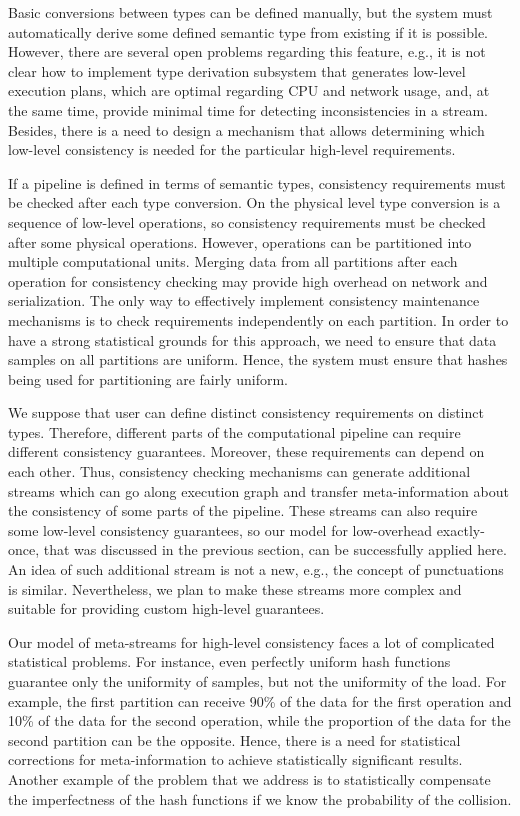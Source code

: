 Basic conversions between types can be defined manually, but the system must automatically derive some defined semantic type from existing if it is possible. However, there are several open problems regarding this feature, e.g., it is not clear how to implement type derivation subsystem that generates low-level execution plans, which are optimal regarding CPU and network usage, and, at the same time, provide minimal time for detecting inconsistencies in a stream. Besides, there is a need to design a mechanism that allows determining which low-level consistency is needed for the particular high-level requirements.  

If a pipeline is defined in terms of semantic types, consistency requirements must be checked after each type conversion. On the physical level type conversion is a sequence of low-level operations, so consistency requirements must be checked after some physical operations. However, operations can be partitioned into multiple computational units. Merging data from all partitions after each operation for consistency checking may provide high overhead on network and serialization. The only way to effectively implement consistency maintenance mechanisms is to check requirements independently on each partition. In order to have a strong statistical grounds for this approach, we need to ensure that data samples on all partitions are uniform. Hence, the system must ensure that hashes being used for partitioning are fairly uniform.

We suppose that user can define distinct consistency requirements on distinct types. Therefore, different parts of the computational pipeline can require different consistency guarantees. Moreover, these requirements can depend on each other. Thus, consistency checking mechanisms can generate additional streams which can go along execution graph and transfer meta-information about the consistency of some parts of the pipeline. These streams can also require some low-level consistency guarantees, so our model for low-overhead exactly-once, that was discussed in the previous section, can be successfully applied here. An idea of such additional stream is not a new, e.g., the concept of punctuations~\cite{Tucker:2003:EPS:776752.776780} is similar. Nevertheless, we plan to make these streams more complex and suitable for providing custom high-level guarantees.

Our model of meta-streams for high-level consistency faces a lot of complicated statistical problems. For instance, even perfectly uniform hash functions guarantee only the uniformity of samples, but not the uniformity of the load. For example, the first partition can receive 90\% of the data for the first operation and 10\% of the data for the second operation, while the proportion of the data for the second partition can be the opposite. Hence, there is a need for statistical corrections for meta-information to achieve statistically significant results. Another example of the problem that we address is to statistically compensate the imperfectness of the hash functions if we know the probability of the collision.  

